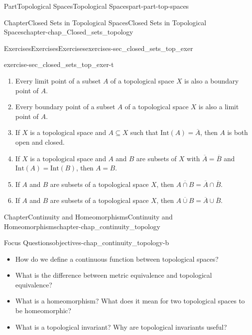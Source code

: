 \documentclass[oneside,10pt,]{book}
\numberwithin{equation}{chapter}
\newcommand{\Int}{\text{Int}}
\begin{document}
\begin{partptx}{Part}{Topological Spaces}{}{Topological Spaces}{}{}{part-part-top-spaces}
\begin{chapterptx}{Chapter}{Closed Sets in Topological Spaces}{}{Closed Sets in Topological Spaces}{}{}{chapter-chap_Closed_sets_topology}
\begin{exercises-section}{Exercises}{Exercises}{}{Exercises}{}{}{exercises-sec_closed_sets_top_exer}
\begin{divisionexercise}{20}{}{}{exercise-sec_closed_sets_top_exer-t}
\begin{enumerate}[font=\bfseries,label=(\alph*),ref=\alph*]%
\item{}Every limit point of a subset \(A\) of a topological space \(X\) is also a boundary point of \(A\).%
\item{}Every boundary point of a subset \(A\) of a topological space \(X\) is also a limit point of \(A\).%
\item{}If \(X\) is a topological space and \(A \subseteq X\) such that \(\Int(A)=\overline{A}\), then \(A\) is both open and closed.%
\item{}If \(X\) is a topological space and \(A\) and \(B\) are subsets of \(X\) with \(\overline{A}=\overline{B}\) and \(\Int(A) = \Int(B)\), then \(A = B\).%
\item{}If \(A\) and \(B\) are subsets of a topological space \(X\), then \(\overline{A \cap B} = \overline{A} \cap \overline{B}\).%
\item{}If \(A\) and \(B\) are subsets of a topological space \(X\), then \(\overline{A \cup B} = \overline{A} \cup \overline{B}\).%
\end{enumerate}%
\end{divisionexercise}%
\end{exercises-section}
\end{chapterptx}
%
\typeout{************************************************}
\typeout{************************************************}
%
\begin{chapterptx}{Chapter}{Continuity and Homeomorphisms}{}{Continuity and Homeomorphisms}{}{}{chapter-chap_continuity_topology}
\renewcommand*{\chaptername}{Chapter}
\begin{objectives}{Focus Questions}{objectives-chap_continuity_topology-b}
%
\begin{itemize}[label=\textbullet]
\item{}How do we define a continuous function between topological spaces?%
\item{}What is the difference between metric equivalence and topological equivalence?%
\item{}What is a homeomorphism? What does it mean for two topological spaces to be homeomorphic?%
\item{}What is a topological invariant? Why are topological invariants useful?%
\end{itemize}
\end{objectives}
%
%
\typeout{************************************************}

\end{chapterptx}
\end{partptx}
\end{document}
